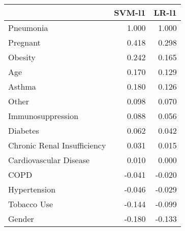 \begin{tabular}{lrr}
\toprule
{} &  SVM-l1 &  LR-l1 \\
\midrule
Pneumonia                   &   1.000 &  1.000 \\
Pregnant                    &   0.418 &  0.298 \\
Obesity                     &   0.242 &  0.165 \\
Age                         &   0.170 &  0.129 \\
Asthma                      &   0.180 &  0.126 \\
Other                       &   0.098 &  0.070 \\
Immunosuppression           &   0.088 &  0.056 \\
Diabetes                    &   0.062 &  0.042 \\
Chronic Renal Insufficiency &   0.031 &  0.015 \\
Cardiovascular Disease      &   0.010 &  0.000 \\
COPD                        &  -0.041 & -0.020 \\
Hypertension                &  -0.046 & -0.029 \\
Tobacco Use                 &  -0.144 & -0.099 \\
Gender                      &  -0.180 & -0.133 \\
\bottomrule
\end{tabular}
